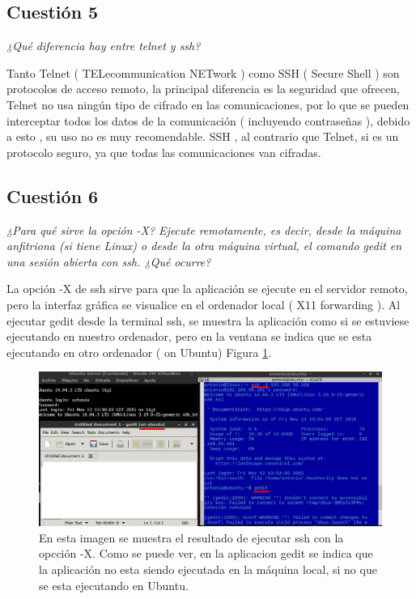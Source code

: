 \subsection{Cuestión 5}
\textit{¿Qué diferencia hay entre telnet y ssh?}
\newline

Tanto Telnet ( TELecommunication NETwork ) como SSH ( Secure Shell ) son protocolos de acceso remoto, la principal diferencia es la seguridad que ofrecen, Telnet no usa ningún tipo de cifrado en las comunicaciones, por lo que se pueden interceptar todos los datos de la comunicación ( incluyendo contraseñas ), debido a esto , su uso no es muy recomendable. SSH , al contrario que Telnet, si es un protocolo seguro, ya que todas las comunicaciones van cifradas.  \cite{sshtle}

\subsection{Cuestión 6}
\textit{¿Para qué sirve la opción -X? Ejecute remotamente, es decir, desde la máquina anfitriona (si tiene Linux) o desde la otra máquina virtual, el comando gedit en una sesión abierta con ssh. ¿Qué ocurre?}
\newline

La opción -X de ssh sirve para que la aplicación se ejecute en el servidor remoto, pero la interfaz gráfica se visualice en el ordenador local ( X11 forwarding ). \cite{sshx} Al ejecutar gedit desde la terminal ssh, se muestra la aplicación como si se estuviese ejecutando en nuestro ordenador, pero en la ventana se indica que se esta ejecutando en otro ordenador ( on Ubuntu) Figura \ref{fig1}. 

\begin{figure}[H]
    \begin{center}
    \advance\leftskip-2.5cm
        \includegraphics[scale=0.5]{imagenes/img1.eps}
        \caption{En esta imagen se muestra el resultado de ejecutar ssh con la opcción -X. Como se puede ver, en la aplicacion gedit se indica que la aplicación no esta siendo ejecutada en la máquina local, si no que se esta ejecutando en Ubuntu.}
        \label{fig1}
    \end{center}
\end{figure}


